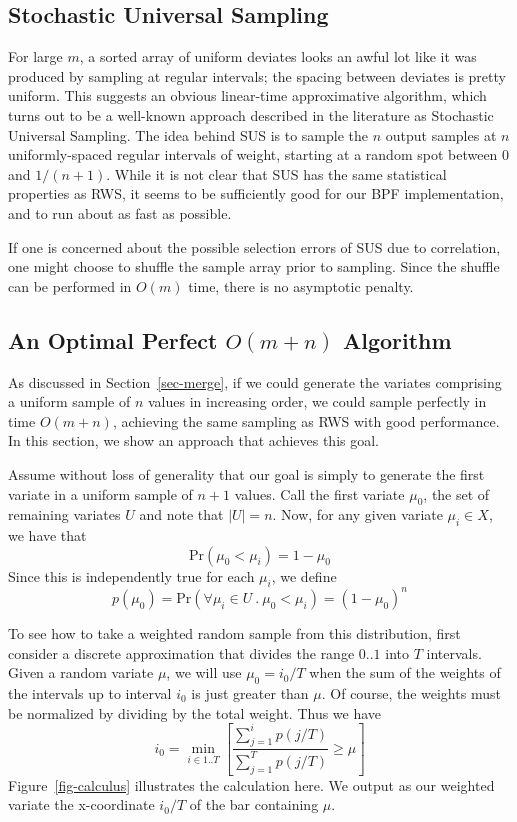\documentclass[12pt]{article}
\newcommand{\Prob}{\text{Pr}}
\begin{document}
\subsection{Stochastic Universal Sampling}\label{sec-regular}

  For large $m$, a sorted array of uniform deviates looks an
  awful lot like it was produced by sampling at regular
  intervals; the spacing between deviates is pretty uniform.
  This suggests an obvious linear-time approximative
  algorithm, which turns out to be a well-known approach
  described in the literature as Stochastic Universal
  Sampling.  The idea behind SUS is to sample the $n$ output
  samples at $n$ uniformly-spaced regular intervals of weight,
  starting at a random spot between $0$ and $1/(n+1)$.  While it
  is not clear that SUS has the same statistical properties
  as RWS, it seems to be sufficiently good for our BPF
  implementation, and to run about as fast as possible.

  If one is concerned about the possible selection errors of
  SUS due to correlation, one might choose to shuffle the
  sample array prior to sampling.  Since the shuffle can be
  performed in $O(m)$ time, there is no asymptotic penalty.

\subsection{An Optimal Perfect $O(m + n)$ Algorithm}\label{sec-optimal}

  As discussed in Section~\ref{sec-merge}, if we could
  generate the variates comprising a uniform sample of $n$
  values in increasing order, we could sample perfectly in
  time $O(m + n)$, achieving the same sampling as RWS with
  good performance.  In this section, we show an approach
  that achieves this goal.

  Assume without loss of generality that our goal is simply
  to generate the first variate in a uniform sample of $n +
  1$ values.  Call the first variate $\mu_0$, the set of
  remaining variates $U$ and note that $|U|=n$.  Now, for
  any given variate $\mu_i \in X$, we have that
    $$ \Prob(\mu_0 < \mu_i) = 1 - \mu_0 $$
  Since this is independently true for each $\mu_i$, we define
    $$p(\mu_0) = \Prob(\forall \mu_i \in U ~.~ \mu_0 < \mu_i) = (1 - \mu_0)^n$$
  
  To see how to take a weighted random sample from this
  distribution, first consider a discrete approximation that
  divides the range $0..1$ into $T$ intervals.  Given a
  random variate $\mu$, we will use $\mu_0=i_0/T$ when
  the sum of the weights of the intervals up to interval $i_0$
  is just greater than $\mu$.  Of course, the weights must be
  normalized by dividing by the total weight.  Thus we have
    $$i_0=\min_{i\in1..T}\left[{\frac{\sum_{j=1}^{i}{p(j/T)}}
                         {\sum_{j=1}^{T}{p(j/T)}} \ge \mu}\right]$$
  Figure~\ref{fig-calculus} illustrates the calculation
  here.  We output as our weighted variate the
  x-coordinate $i_0/T$ of the bar containing $\mu$.
\end{document}
